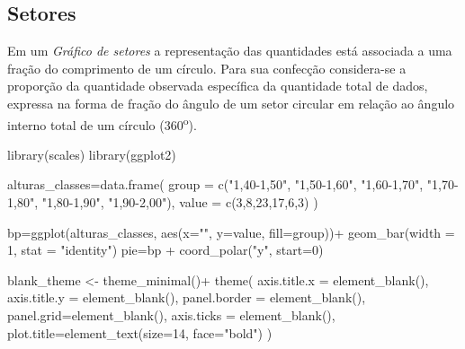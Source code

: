 \documentclass[
]{book}
\newenvironment{Shaded}{\begin{snugshade}}{\end{snugshade}}
\newcommand{\AttributeTok}[1]{\textcolor[rgb]{0.77,0.63,0.00}{#1}}
\newcommand{\DecValTok}[1]{\textcolor[rgb]{0.00,0.00,0.81}{#1}}
\newcommand{\FunctionTok}[1]{\textcolor[rgb]{0.00,0.00,0.00}{#1}}
\newcommand{\NormalTok}[1]{#1}
\newcommand{\OtherTok}[1]{\textcolor[rgb]{0.56,0.35,0.01}{#1}}
\newcommand{\SpecialCharTok}[1]{\textcolor[rgb]{0.00,0.00,0.00}{#1}}
\newcommand{\StringTok}[1]{\textcolor[rgb]{0.31,0.60,0.02}{#1}}
\begin{document}
\hypertarget{setores}{%
\subsection{Setores}\label{setores}}

Em um \emph{Gráfico de setores} a representação das quantidades está associada a uma fração do comprimento de um círculo. Para sua confecção considera-se a proporção da quantidade observada específica da quantidade total de dados, expressa na forma de fração do ângulo de um setor circular em relação ao ângulo interno total de um círculo (360\textsuperscript{o}).

\begin{Shaded}
\begin{Highlighting}[]
\FunctionTok{library}\NormalTok{(scales)}
\FunctionTok{library}\NormalTok{(ggplot2)}

\NormalTok{alturas\_classes}\OtherTok{=}\FunctionTok{data.frame}\NormalTok{(}
  \AttributeTok{group =} \FunctionTok{c}\NormalTok{(}\StringTok{"1,40{-}1,50"}\NormalTok{,}
            \StringTok{"1,50{-}1,60"}\NormalTok{,}
            \StringTok{"1,60{-}1,70"}\NormalTok{,}
            \StringTok{"1,70{-}1,80"}\NormalTok{,}
            \StringTok{"1,80{-}1,90"}\NormalTok{,}
            \StringTok{"1,90{-}2,00"}\NormalTok{),}
  \AttributeTok{value =} \FunctionTok{c}\NormalTok{(}\DecValTok{3}\NormalTok{,}\DecValTok{8}\NormalTok{,}\DecValTok{23}\NormalTok{,}\DecValTok{17}\NormalTok{,}\DecValTok{6}\NormalTok{,}\DecValTok{3}\NormalTok{)}
\NormalTok{)}

\NormalTok{bp}\OtherTok{=}\FunctionTok{ggplot}\NormalTok{(alturas\_classes, }\FunctionTok{aes}\NormalTok{(}\AttributeTok{x=}\StringTok{""}\NormalTok{, }\AttributeTok{y=}\NormalTok{value, }\AttributeTok{fill=}\NormalTok{group))}\SpecialCharTok{+}
  \FunctionTok{geom\_bar}\NormalTok{(}\AttributeTok{width =} \DecValTok{1}\NormalTok{, }\AttributeTok{stat =} \StringTok{"identity"}\NormalTok{)}
\NormalTok{pie}\OtherTok{=}\NormalTok{bp }\SpecialCharTok{+} \FunctionTok{coord\_polar}\NormalTok{(}\StringTok{"y"}\NormalTok{, }\AttributeTok{start=}\DecValTok{0}\NormalTok{)}

\NormalTok{blank\_theme }\OtherTok{\textless{}{-}} \FunctionTok{theme\_minimal}\NormalTok{()}\SpecialCharTok{+}
  \FunctionTok{theme}\NormalTok{(}
    \AttributeTok{axis.title.x =} \FunctionTok{element\_blank}\NormalTok{(),}
    \AttributeTok{axis.title.y =} \FunctionTok{element\_blank}\NormalTok{(),}
    \AttributeTok{panel.border =} \FunctionTok{element\_blank}\NormalTok{(),}
    \AttributeTok{panel.grid=}\FunctionTok{element\_blank}\NormalTok{(),}
    \AttributeTok{axis.ticks =} \FunctionTok{element\_blank}\NormalTok{(),}
    \AttributeTok{plot.title=}\FunctionTok{element\_text}\NormalTok{(}\AttributeTok{size=}\DecValTok{14}\NormalTok{, }\AttributeTok{face=}\StringTok{"bold"}\NormalTok{)}
\NormalTok{  )}


\end{Highlighting}
\end{Shaded}
\end{document}
